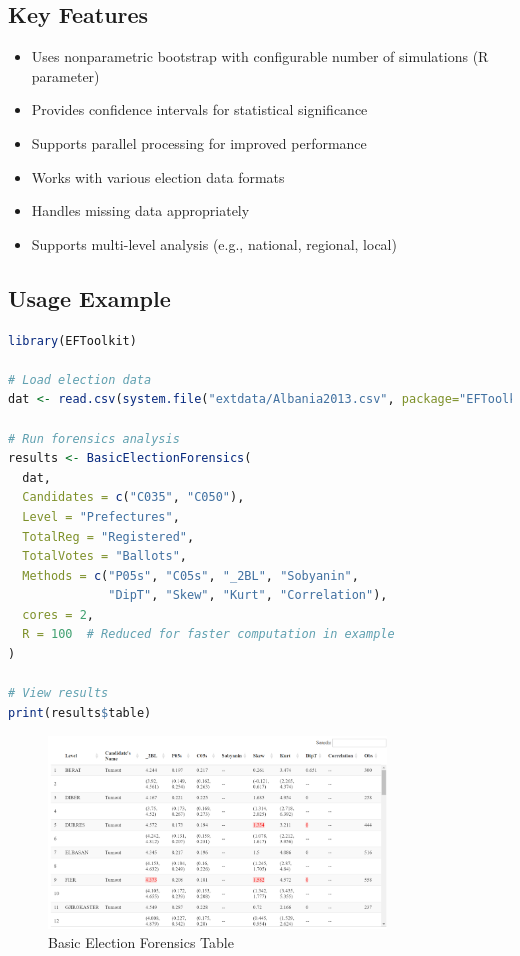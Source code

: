 \documentclass{article}
\begin{document}
\subsection{Key Features}
\begin{itemize}
    \item Uses nonparametric bootstrap with configurable number of simulations (R parameter)
    \item Provides confidence intervals for statistical significance
    \item Supports parallel processing for improved performance
    \item Works with various election data formats
    \item Handles missing data appropriately
    \item Supports multi-level analysis (e.g., national, regional, local)
\end{itemize}

\subsection{Usage Example}
\begin{lstlisting}[language=R]
library(EFToolkit)

# Load election data
dat <- read.csv(system.file("extdata/Albania2013.csv", package="EFToolkit"))

# Run forensics analysis
results <- BasicElectionForensics(
  dat,
  Candidates = c("C035", "C050"),
  Level = "Prefectures", 
  TotalReg = "Registered",
  TotalVotes = "Ballots",
  Methods = c("P05s", "C05s", "_2BL", "Sobyanin", 
              "DipT", "Skew", "Kurt", "Correlation"),
  cores = 2, 
  R = 100  # Reduced for faster computation in example
)

# View results
print(results$table)
\end{lstlisting}

\begin{figure}[h]
\centering
\includegraphics[width=0.8\textwidth]{inst/figures/EFT_table.png}
\caption{Basic Election Forensics Table}
\end{figure}
\end{document}
